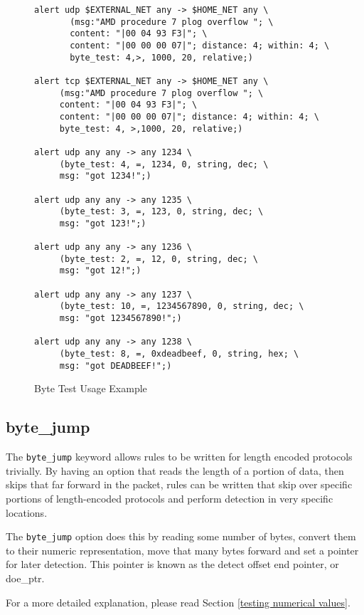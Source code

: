 \documentclass[english]{report}
\begin{document}
\begin{figure}[!hbpt]
\begin{verbatim}
alert udp $EXTERNAL_NET any -> $HOME_NET any \
       (msg:"AMD procedure 7 plog overflow "; \
       content: "|00 04 93 F3|"; \
       content: "|00 00 00 07|"; distance: 4; within: 4; \
       byte_test: 4,>, 1000, 20, relative;)

alert tcp $EXTERNAL_NET any -> $HOME_NET any \
     (msg:"AMD procedure 7 plog overflow "; \
     content: "|00 04 93 F3|"; \
     content: "|00 00 00 07|"; distance: 4; within: 4; \
     byte_test: 4, >,1000, 20, relative;)

alert udp any any -> any 1234 \
     (byte_test: 4, =, 1234, 0, string, dec; \
     msg: "got 1234!";)

alert udp any any -> any 1235 \
     (byte_test: 3, =, 123, 0, string, dec; \
     msg: "got 123!";)

alert udp any any -> any 1236 \
     (byte_test: 2, =, 12, 0, string, dec; \
     msg: "got 12!";)

alert udp any any -> any 1237 \
     (byte_test: 10, =, 1234567890, 0, string, dec; \
     msg: "got 1234567890!";)

alert udp any any -> any 1238 \
     (byte_test: 8, =, 0xdeadbeef, 0, string, hex; \
     msg: "got DEADBEEF!";)
\end{verbatim}
\caption{Byte Test Usage Example \label{fig:byte_test}}
\end{figure}

\subsection{byte\_jump\label{sub:byte_jump}}

The \texttt{byte\_jump} keyword allows rules to be written for length encoded protocols 
trivially. By having an option that reads the length of a portion of data,
then skips that far forward in the packet, rules can be written that skip
over specific portions of length-encoded protocols and perform detection in very specific locations.

The \texttt{byte\_jump} option does this by reading some number of bytes, convert them
to their numeric representation, move that many bytes forward and set a pointer
for later detection.  This pointer is known as the detect offset end pointer, or doe\_ptr.

For a more detailed explanation, please read Section \ref{testing numerical values}.
\end{document}
